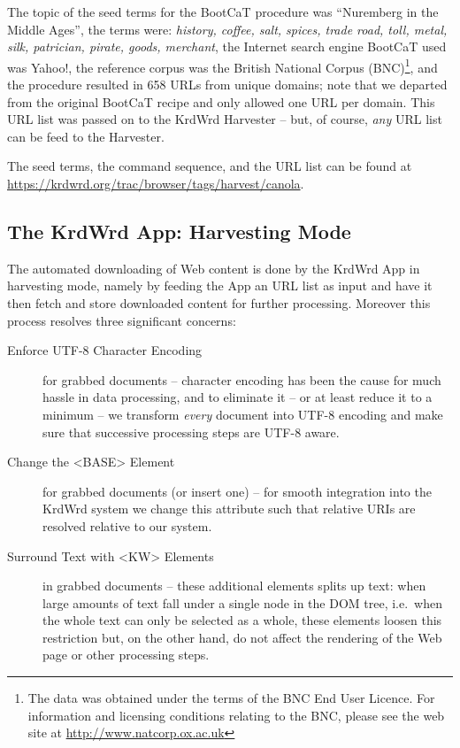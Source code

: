 \begin{longversion}
The topic of the seed terms for the BootCaT procedure was ``Nuremberg in the Middle Ages'', the terms were:
\emph{
        history,
        coffee,
        salt,
        spices,
        trade road,
        toll,
        metal,
        silk,
        patrician,
        pirate,
        goods,
        merchant}, 
the Internet search engine BootCaT used was Yahoo!\cite{yahoo}, 
the reference corpus was the British National Corpus (BNC)\footnote{The data was obtained under the terms of the BNC End User Licence. For information and licensing conditions relating to the BNC, please see the web site at \url{http://www.natcorp.ox.ac.uk}}, 
and the procedure resulted in 658 URLs from unique domains; 
note that we departed from the original BootCaT recipe and only allowed one URL per domain.  
This URL list was passed on to the KrdWrd Harvester -- but, of course, \emph{any} URL list can be feed to the Harvester.

\noindent \linebreak
The seed terms, the command sequence, and the URL list can be found at \url{https://krdwrd.org/trac/browser/tags/harvest/canola}.


\subsection{The KrdWrd App: Harvesting Mode}

The automated downloading of Web content is done by the KrdWrd App in harvesting mode, namely by feeding the App an URL list as input and have it then fetch and store downloaded content for further processing. Moreover this process resolves three significant concerns:
\begin{description}
\item[Enforce UTF-8 Character Encoding] for grabbed documents -- character encoding has been the cause for much hassle in data processing, and to eliminate it -- or at least reduce it to a minimum -- we transform \emph{every} document into UTF-8 encoding \cite{unicode.org} and make sure that successive processing steps are UTF-8 aware.
\item[Change the <BASE> Element] for grabbed documents (or insert one) \cite{w3.org/base, w3.org/Addressing} -- for smooth integration into the KrdWrd system  we change this attribute such that relative URIs are resolved relative to our system. 
\item[Surround Text with <KW> Elements] in grabbed documents -- these additional elements splits up text: when large amounts of text fall under a single node in the DOM tree, i.e.~when the whole text can only be selected as a whole, these elements loosen this restriction but, on the other hand, do not affect the rendering of the Web page or other processing steps.     
\end{description}


\end{longversion}
